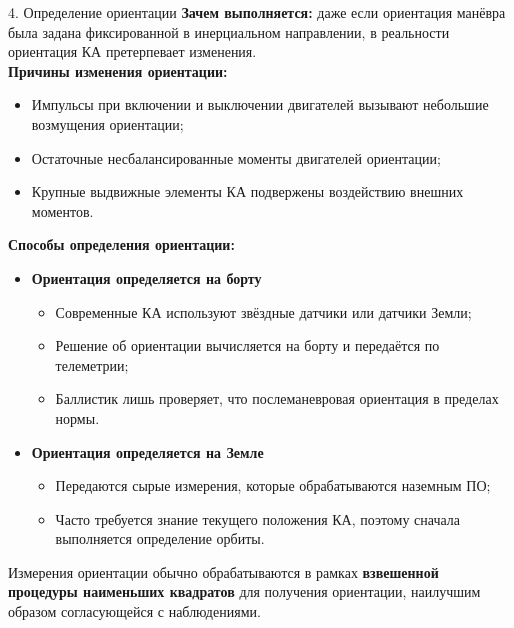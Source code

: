 \documentclass[8pt]{beamer}
\begin{document}
\begin{frame}{4. Определение ориентации}
\textbf{Зачем выполняется:} даже если ориентация манёвра была задана фиксированной в инерциальном направлении, в реальности ориентация КА претерпевает изменения. \\
\textbf{Причины изменения ориентации:}
\begin{itemize}
    \item Импульсы при включении и выключении двигателей вызывают небольшие возмущения ориентации;
    \item Остаточные несбалансированные моменты двигателей ориентации;
    \item Крупные выдвижные элементы КА подвержены воздействию внешних моментов.
\end{itemize}
\textbf{Способы определения ориентации:}
\begin{itemize}
    \item \textbf{Ориентация определяется на борту}
    \begin{itemize}
        \item Современные КА используют звёздные датчики или датчики Земли;
        \item Решение об ориентации вычисляется на борту и передаётся по телеметрии;
        \item Баллистик лишь проверяет, что послеманевровая ориентация в пределах нормы.
    \end{itemize}

    \item \textbf{Ориентация определяется на Земле}
    \begin{itemize}
        \item Передаются сырые измерения, которые обрабатываются наземным ПО;
        \item Часто требуется знание текущего положения КА, поэтому сначала выполняется определение орбиты.
    \end{itemize}
\end{itemize}

Измерения ориентации обычно обрабатываются в рамках \textbf{взвешенной процедуры наименьших квадратов} для получения ориентации, наилучшим образом согласующейся с наблюдениями.
\end{frame}
\end{document}
